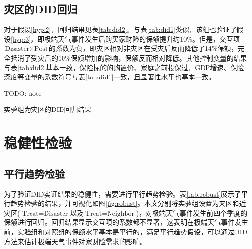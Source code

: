 \subsection{灾区的DID回归}
对于假设\ref{hyp:2}，回归结果见表\ref{tab:did2}。与表\ref{tab:did1}类似，该组也验证了假设\ref{hyp:3}，即极端天气事件发生后购买家财险的保额提升约10\%。但是，交互项$\text{Disaster}\times \text{Post}$的系数为负，即灾区相对非灾区在受灾后反而降低了14\%保额，完全抵消了受灾后的10\%保额增加的影响，保额反而相对降低。其他控制变量的结果与表\ref{tab:did2}基本一致，保险标的的购置价、家庭之前投保过、GDP增速、保险深度等变量的系数符号与表\ref{tab:did1}一致，且显著性水平也基本一致。

TODO: note
\begin{table}[H]
    \centering
    \caption{实验组为灾区的DID回归结果}\label{tab:did2}
    
\end{table}

\section{稳健性检验}
\subsection{平行趋势检验}

为了验证DID实证结果的稳健性，需要进行平行趋势检验。表\ref{tab:robust}展示了平行趋势检验的结果，并可视化如图\ref{fig:robust}。本文分别将实验组设置为灾区和近灾区($\text{Treat}=\text{Disaster}$以及$\text{Treat}=\text{Neighbor}$)，对极端天气事件发生前四个季度的保额进行回归。回归结果显示交互项的系数都不显著，这表明在极端天气事件发生前，实验组和对照组的保额水平基本是平行的，满足平行趋势假设，可以通过DID方法来估计极端天气事件对家财险需求的影响。

